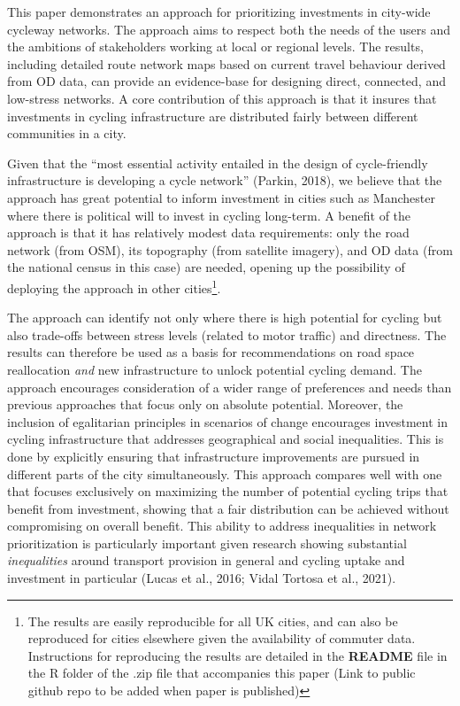 \documentclass[
]{article}
\begin{document}
This paper demonstrates an approach for prioritizing
investments in city-wide cycleway networks. The approach aims to respect
both the needs of the users and the ambitions of stakeholders working at
local or regional levels. The results, including detailed route network
maps based on current travel behaviour derived from OD data, can provide
an evidence-base for designing direct, connected,
and low-stress networks. A core contribution of this approach is that it insures
that investments in cycling infrastructure are distributed fairly between different
communities in a city.

Given that the ``most essential activity entailed in the design of
cycle-friendly infrastructure is developing a cycle network''
(Parkin, 2018), we believe that the approach has great
potential to inform investment in cities such as Manchester where there
is political will to invest in cycling long-term. A benefit of the
approach is that it has relatively modest data requirements: only the
road network (from OSM), its topography (from satellite imagery), and
OD data (from the national census in this case) are
needed, opening up the possibility of deploying the approach in other
cities\footnote{The results are easily reproducible for all UK cities, and can also be reproduced for cities elsewhere given the availability of commuter data. Instructions for reproducing the results are detailed in the \textbf{README} file in the R folder of the .zip file that accompanies this paper (Link to public github repo to be added when paper is published)}.

The approach can identify not only where there is high
potential for cycling but also trade-offs between
stress levels (related to motor traffic) and directness.
The results can therefore be used as a basis for recommendations on
road space reallocation \emph{and} new infrastructure to unlock potential cycling demand.
The approach encourages consideration of a wider range of preferences
and needs than previous approaches that focus only on absolute potential.
Moreover, the inclusion of egalitarian principles in scenarios of change
encourages investment in cycling infrastructure that addresses geographical and
social inequalities. This is done by explicitly ensuring that infrastructure improvements
are pursued in different parts of the city simultaneously. This approach compares well with one
that focuses exclusively on maximizing the number of potential cycling trips that
benefit from investment, showing that a fair distribution can be achieved without
compromising on overall benefit.
This ability to address inequalities in network prioritization is particularly
important given research showing substantial \emph{inequalities}
around transport provision in general and cycling uptake and investment
in particular (Lucas et al., 2016; Vidal Tortosa et al., 2021).
\end{document}
